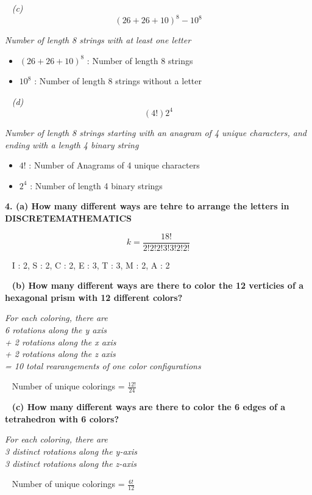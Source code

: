 \documentclass[12pt, letterpaper]{article}
\begin{document}
\-\ \newline
\it{ (c) }
\[ (26 + 26 + 10)^{8} - 10^{8} \]

\emph{Number of length 8 strings with at least one letter}

\begin{itemize}
    \item \((26 + 26 + 10)^{8}\) : Number of length 8 strings
    \item \(10^{8}\) : Number of length 8 strings without a letter
\end{itemize}

\-\ \newline
\it{ (d) }
\[ (4!)2^{4} \]

\emph{ Number of length 8 strings starting with an anagram of 4 unique characters, and ending with a length 4 binary string }

\begin{itemize}
    \item \(4!\) : Number of Anagrams of 4 unique characters
    \item \(2^{4}\) : Number of length 4 binary strings
\end{itemize}


\newpage
\bf{ 4. (a) How many different ways are tehre to arrange the letters in DISCRETEMATHEMATICS }

\[ k = \frac{18!}{ 2!2!2!3!3!2!2! }  \]

\-\ \newline
\textnormal{I : 2, S : 2, C : 2, E : 3, T : 3, M : 2, A : 2}


\-\ \newline
\bf{ (b) How many different ways are there to color the 12 verticies of a hexagonal prism with 12 different colors? } \newline

\textnormal{\it{ For each coloring, there are \\
  6 rotations along the y axis \\
+ 2 rotations along the x axis \\
+ 2 rotations along the z axis \\
= 10 total rearangements of one color configurations}} 

\-\ \newline
\textnormal{Number of unique colorings = \( \frac{12!}{24} \)}


\-\ \newline
\bf{ (c) How many different ways are there to color the 6 edges of a tetrahedron with 6 colors? } \newline

\textnormal{\it{ For each coloring, there are \\
3 distinct rotations along the y-axis \\
3 distinct rotations along the z-axis
}}

\-\ \newline
\textnormal{ Number of unique colorings = \( \frac{6!}{12} \) }
\end{document}
